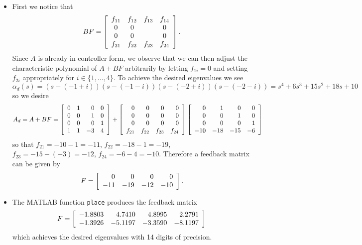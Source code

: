 \documentclass{article}
\begin{document}
\begin{itemize}
\item{
First we notice
that
$$
BF =
\left[\begin{array}{c c c c}
  f_{11} & f_{12} & f_{13} & f_{14} \\
  0     & 0     &       & 0      \\
  0     & 0     &       & 0      \\
  f_{21} & f_{22} & f_{23} & f_{24}
\end{array}\right].
$$
Since $A$ is already in controller form, we observe that we can then
adjust the characteristic polynomial of $A + BF$ arbitrarily by letting
$f_{1i} = 0$ and setting $f_{2i}$ appropriately for
$i \in \{ 1, \dots, 4 \}$. To achieve the desired eigenvalues we see
$$
\alpha_d(s) =
  (s - (-1 + i))
  (s - (-1 - i))
  (s - (-2 + i))
  (s - (-2 - i)) =
  s^4 + 6s^3 + 15s^2 + 18s + 10
$$
so we desire
$$
A_d = A + BF =
\left[\begin{array}{r r r r}
  0 & 1 &  0 & 0 \\
  0 & 0 &  1 & 0 \\
  0 & 0 &  0 & 1 \\
  1 & 1 & -3 & 4
\end{array}\right]
+
\left[\begin{array}{r r r r}
0     &     0 &     0 &     0 \\
0     &     0 &     0 &     0 \\
0     &     0 &     0 &     0 \\
f_{21} & f_{22} & f_{23} & f_{24}
\end{array}\right]
\left[\begin{array}{r r r r}
0   &   1 &   0 &  0 \\
0   &   0 &   1 &  0 \\
0   &   0 &   0 &  1 \\
-10 & -18 & -15 & -6
\end{array}\right]
$$
so that $f_{21} = -10 - 1 = -11$, $f_{22} = -18 - 1 = -19$,
$f_{23} = -15 - (-3) = -12$, $f_{24} = -6 - 4 = -10$. Therefore a feedback
matrix can be given by
$$
F =
\left[\begin{array}{r r r r}
   0   &   0 &   0 &   0 \\
   -11 & -19 & -12 & -10
\end{array}\right].
$$
}
\item
{
  The MATLAB function \texttt{place} produces the feedback matrix
  $$
  F =
  \left[\begin{array}{r r r r}
    -1.8803 &  4.7410 &  4.8995 &  2.2791 \\
    -1.3926 & -5.1197 & -3.3590 & -8.1197
  \end{array}\right]
  $$
  which achieves the desired eigenvalues with 14 digits of precision.
}
\end{itemize}
\end{document}
